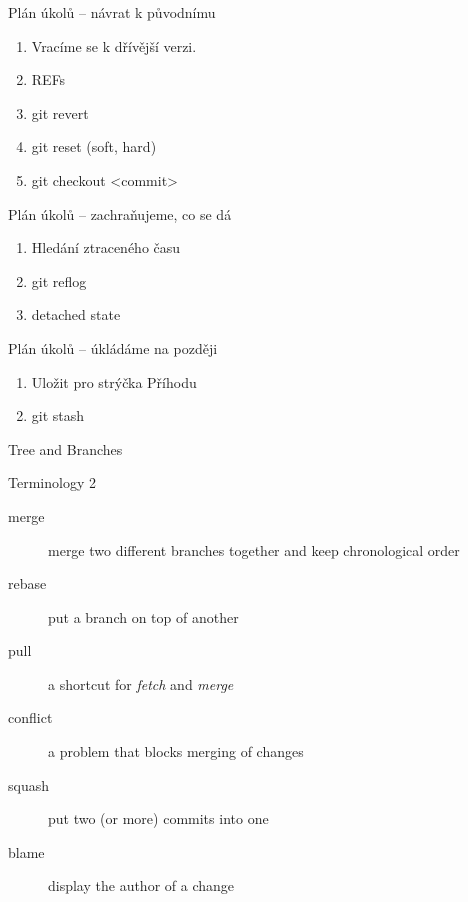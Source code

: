 \documentclass[14pt]{beamer}
\begin{document}
	\begin{frame}{Plán úkolů -- návrat k původnímu}
	\begin{enumerate}
		\item Vracíme se k dřívější verzi.
		\item REFs
		\item git revert
		\item git reset (soft, hard)
		\item git checkout <commit>
	\end{enumerate}
	\end{frame}

	\begin{frame}{Plán úkolů -- zachraňujeme, co se dá}
		\begin{enumerate}
			\item Hledání ztraceného času
			\item git reflog
			\item detached state
		\end{enumerate}
	\end{frame}

	\begin{frame}{Plán úkolů -- úkládáme na později}
	\begin{enumerate}
		\item Uložit pro strýčka Příhodu
		\item git stash
	\end{enumerate}
	\end{frame}

	
	\begin{frame}{Tree and Branches}
    \begin{center}
	\end{center}
	\end{frame}

	\begin{frame}{Terminology 2}
	\begin{description}
		\item[merge] merge two different branches together and keep chronological order
		\item[rebase] put a branch on top of another
		\item[pull] a shortcut for \textit{fetch} and \textit{merge}
		\item[conflict] a problem that blocks merging of changes
		\item[squash] put two (or more) commits into one
		\item[blame] display the author of a change
	\end{description}
	\end{frame}
\end{document}
